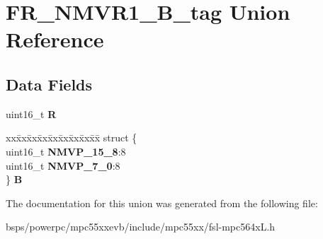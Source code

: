 \hypertarget{unionFR__NMVR1__16B__tag}{}\section{F\+R\+\_\+\+N\+M\+V\+R1\+\_\+B\+\_\+tag Union Reference}
\label{unionFR__NMVR1__16B__tag}
\subsection*{Data Fields}
\begin{DoxyCompactItemize}
\item 
\mbox{\label{unionFR__NMVR1__16B__tag_a4aec6150a725e06e12f484c73aa37092}} 
uint16\+\_\+t {\bfseries R}
\item 
\mbox{\label{unionFR__NMVR1__16B__tag_a0f2046be9b55a46ee531cde75855bfd5}} 
\begin{tabbing}
xx\=xx\=xx\=xx\=xx\=xx\=xx\=xx\=xx\=\kill
struct \{\\
\>uint16\_t {\bfseries NMVP\_15\_8}:8\\
\>uint16\_t {\bfseries NMVP\_7\_0}:8\\
\} {\bfseries B}\\

\end{tabbing}\end{DoxyCompactItemize}


The documentation for this union was generated from the following file\+:\begin{DoxyCompactItemize}
\item 
bsps/powerpc/mpc55xxevb/include/mpc55xx/fsl-\/mpc564x\+L.\+h\end{DoxyCompactItemize}
